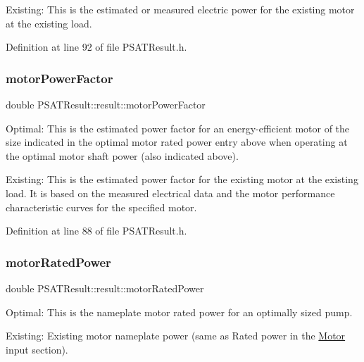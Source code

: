 Existing\+: This is the estimated or measured electric power for the existing motor at the existing load. 

Definition at line 92 of file P\+S\+A\+T\+Result.\+h.

\mbox{\label{struct_p_s_a_t_result_1_1result_adf9772ebbf9b68a436fbbf75208027b8}} 
\subsubsection{\texorpdfstring{motor\+Power\+Factor}{motorPowerFactor}}
{\footnotesize\ttfamily double P\+S\+A\+T\+Result\+::result\+::motor\+Power\+Factor}



Optimal\+: This is the estimated power factor for an energy-\/efficient motor of the size indicated in the optimal motor rated power entry above when operating at the optimal motor shaft power (also indicated above). 

Existing\+: This is the estimated power factor for the existing motor at the existing load. It is based on the measured electrical data and the motor performance characteristic curves for the specified motor. 

Definition at line 88 of file P\+S\+A\+T\+Result.\+h.

\mbox{\label{struct_p_s_a_t_result_1_1result_acee4fa628de4b65c6fcd58d22432244a}} 
\subsubsection{\texorpdfstring{motor\+Rated\+Power}{motorRatedPower}}
{\footnotesize\ttfamily double P\+S\+A\+T\+Result\+::result\+::motor\+Rated\+Power}



Optimal\+: This is the nameplate motor rated power for an optimally sized pump. 

Existing\+: Existing motor nameplate power (same as Rated power in the \hyperlink{class_motor}{Motor} input section). 

